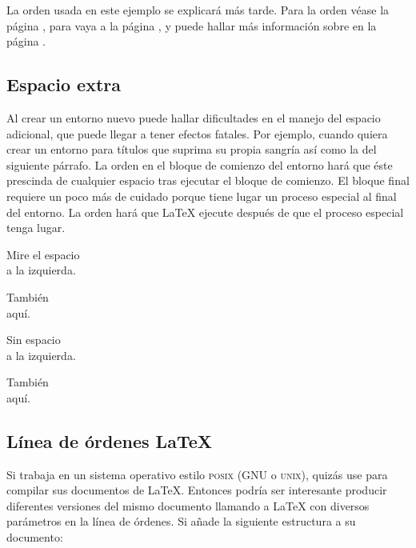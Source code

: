 La orden usada en este ejemplo se explicará más tarde.  Para la orden  véase la página \pageref{sec:rule}, para  vaya a la página \pageref{cmd:stretch}, y puede hallar más información sobre  en la página \pageref{sec:hspace}.

\subsection{Espacio extra}

Al crear un entorno nuevo puede hallar dificultades en el manejo del espacio adicional, que puede llegar a tener efectos fatales.  Por ejemplo, cuando quiera crear un entorno para títulos que suprima su propia sangría así como la del siguiente párrafo.  La orden  en el bloque de comienzo del entorno hará que éste prescinda de cualquier espacio tras ejecutar el bloque de comienzo. El bloque final requiere un poco más de cuidado porque tiene lugar un proceso especial al final del entorno.  La orden  hará que \LaTeX{} ejecute  después de que el proceso especial tenga lugar.

\begin{example}
\newenvironment{simple}%
 {\noindent}%
 {\par\noindent}

\begin{simple}
Mire el espacio\\a la izquierda.
\end{simple}
También\\aquí.
\end{example}

\begin{example}
\newenvironment{correct}%
 {\noindent\ignorespaces}%
 {\par\noindent%
   \ignorespacesafterend}

\begin{correct}
Sin espacio\\a la izquierda.
\end{correct}
También\\aquí.
\end{example}

\subsection{Línea de órdenes \LaTeX}

Si trabaja en un sistema operativo estilo \textsc{posix} (GNU o \textsc{unix}), quizás use  para compilar sus documentos de \LaTeX{}.  Entonces podría ser interesante producir diferentes versiones del mismo documento llamando a \LaTeX{} con diversos parámetros en la línea de órdenes.  Si añade la siguiente estructura a su documento:

